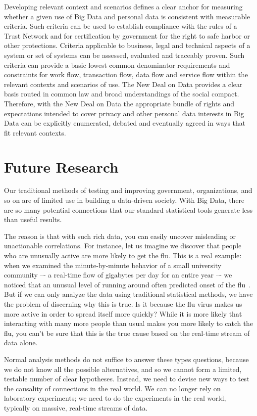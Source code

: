  
Developing relevant context and scenarios defines a clear anchor for measuring whether a given use of Big Data and personal data is consistent with measurable criteria.  Such criteria can be used to establish compliance with the rules of a Trust Network and for certification by government for the right to safe harbor or other protections.  Criteria applicable to business, legal and technical aspects of a system or set of systems can be assessed, evaluated and traceably proven. Such criteria can provide a basic lowest common denominator requirements and constraints for work flow, transaction flow, data flow and service flow within the relevant contexts and scenarios of use.  The New Deal on Data provides a clear basis routed in common law and broad understandings of the social compact.  Therefore, with the New Deal on Data the appropriate bundle of rights and expectations intended to cover privacy and other personal data interests in Big Data can be explicitly enumerated, debated and eventually agreed in ways that fit relevant contexts.  


\section{Future Research }

Our traditional methods of testing and improving government, organizations, and so on are of limited use in building a data-driven society.  With Big Data, there are so many potential connections that our standard statistical tools generate less than useful results.  

The reason is that with such rich data, you can easily uncover misleading or unactionable correlations.
For instance, let us imagine we discover that people who are unusually active are more likely to get the flu.
This is a real example: when we examined the minute-by-minute behavior of a small university community –- a real-time flow of gigabytes per day for an entire year –- we noticed that an unusual level of running around often predicted onset of the flu~\cite{madan2010social}.
But if we can only analyze the data using traditional statistical methods, we have the problem of discerning why this is true.
Is it because the flu virus makes us more active in order to spread itself more quickly?
While it is more likely that interacting with many more people than usual makes you more likely to catch the flu, you can't be sure that this is the true cause based on the real-time stream of data alone.

Normal analysis methods do not suffice to answer these types questions, because we do not know all the possible alternatives, and so we cannot form a limited, testable number of clear hypotheses.
Instead, we need to devise new ways to test the causality of connections in the real world.
We can no longer rely on laboratory experiments; we need to do the experiments in the real world, typically on massive, real-time streams of data.

